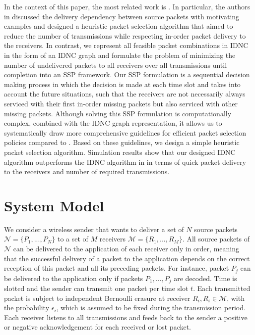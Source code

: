 \documentclass[12pt, peerreview, onecolumn]{IEEEtran}
\begin{document}
In the context of this paper, the most related work is \cite{wanginstantly}. In particular,  the authors in \cite{wanginstantly}  discussed the  delivery dependency between source packets with motivating examples  and  designed a heuristic packet selection algorithm that aimed to reduce the number of  transmissions  while respecting in-order packet delivery to the receivers. In contrast, we  represent all feasible packet combinations in IDNC in the form of an IDNC graph and formulate the problem of minimizing the  number of  undelivered packets to all receivers over all transmissions until completion into an SSP framework.  Our SSP formulation is a sequential decision making process in which  the decision is made at each time slot and  takes into account the future situations,  such that the  receivers  are not necessarily always serviced with their  first in-order missing packets but  also serviced with  other missing packets. Although solving this SSP formulation is computationally  complex,  combined with the IDNC graph representation, it allows us to systematically   draw more comprehensive
 guidelines  for  efficient packet selection policies compared to \cite{wanginstantly}. Based on these guidelines, we design  a simple heuristic packet selection  algorithm. Simulation results show that our designed IDNC algorithm  outperforms the IDNC algorithm in \cite{wanginstantly} in terms of quick packet   delivery  to the receivers and number of required transmissions.





\vspace{-5mm}
\section{System Model} \label{tools}
We consider a wireless sender that wants to  deliver a set   of $N$ source packets  $\mathcal{N} = \{ P_1,...,P_N\}$ to a set  of $M$ receivers $\mathcal{M} = \{R_1,...,R_M\}$.\footnotemark {} All source packets of $\mathcal{N}$ can be delivered to the application of each receiver only in order,  meaning that the successful delivery of a packet to the application  depends on the correct reception of this packet and all its preceding packets. For instance, packet $P_j$ can be delivered to the application only if packets  $P_1,...,P_j$ are  decoded.   Time is slotted and the sender can transmit one packet per  time slot $t$. Each transmitted packet is subject to independent Bernoulli erasure at receiver $R_i, R_i\in \mathcal{M}$, with the probability $\epsilon_i$, which is assumed to be fixed during the  transmission period.  Each receiver listens to all transmissions  and  feeds back to the sender a positive or negative acknowledgement for each received or lost packet.
\end{document}
